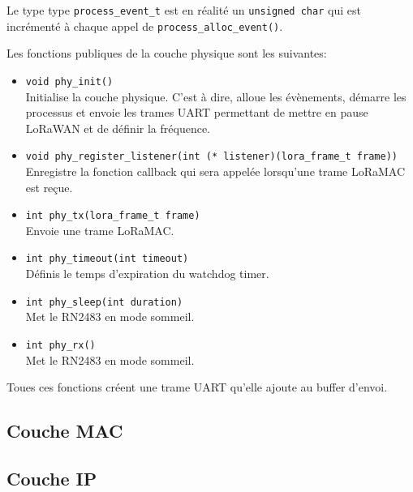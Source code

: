     Le type type \texttt{process\_event\_t} est en réalité un \texttt{unsigned char} qui est incrémenté à chaque appel de \texttt{process\_alloc\_event()}.

    Les fonctions publiques de la couche physique sont les suivantes:
    \begin{itemize}
        \item \texttt{void phy\_init()}\\
            Initialise la couche physique. C'est à dire, alloue les évènements, démarre les processus et envoie les trames UART permettant de mettre en pause LoRaWAN et de définir la fréquence.
        \item \texttt{void phy\_register\_listener(int (* listener)(lora\_frame\_t frame))}\\
            Enregistre la fonction callback qui sera appelée lorsqu'une trame LoRaMAC est reçue.
        \item \texttt{int phy\_tx(lora\_frame\_t frame)}\\
            Envoie une trame LoRaMAC.
        \item \texttt{int phy\_timeout(int timeout)}\\
            Définis le temps d'expiration du watchdog timer.
        \item \texttt{int phy\_sleep(int duration)}\\
            Met le RN2483 en mode sommeil.
        \item \texttt{int phy\_rx()}\\
            Met le RN2483 en mode sommeil.
    \end{itemize}

    Toues ces fonctions créent une trame UART qu'elle ajoute au buffer d'envoi.

\subsection*{Couche MAC}
\subsection*{Couche IP}
